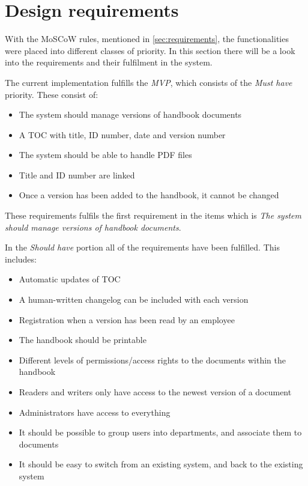 \section{Design requirements}\label{sec:disdesignrequirements}
With the MoSCoW rules, mentioned in \cref{sec:requirements}, the functionalities were placed into different classes of priority.
In this section there will be a look into the requirements and their fulfilment in the system.

The current implementation fulfills the \textit{MVP}, which consists of the \textit{Must have} priority.
These consist of:

\begin{itemize}
	\item
	The system should manage versions of handbook documents
	\item
    A TOC with title, ID number, date and version number
    \item
    The system should be able to handle PDF files
    \item
    Title and ID number are linked
    \item
    Once a version has been added to the handbook, it cannot be changed
\end{itemize}

These requirements fulfils the first requirement in the items which is \textit{The system should manage versions of handbook documents}.

In the \textit{Should have} portion all of the requirements have been fulfilled.
This includes:

\begin{itemize}
	\item
	Automatic updates of TOC
    \item
	A human-written changelog can be included with each version
	\item
    Registration when a version has been read by an employee
    \item
    The handbook should be printable
    \item
   	Different levels of permissions/access rights to the documents within the handbook
    \item
    Readers and writers only have access to the newest version of a document
    \item
    Administrators have access to everything
   	\item
    It should be possible to group users into departments, and associate them to documents
    \item
    It should be easy to switch from an existing system, and back to the existing system
\end{itemize}

